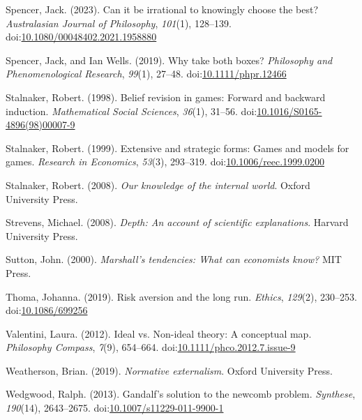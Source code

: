 \documentclass[
  12pt,
  letterpaper,
  DIV=11,
  numbers=noendperiod]{scrreprt}
\newlength{\cslhangindent}
\newenvironment{CSLReferences}[2] %
 {\begin{list}{}{%
  \setlength{\itemindent}{0pt}
  \setlength{\leftmargin}{0pt}
  \setlength{\parsep}{0pt}
  \ifodd #1
   \setlength{\leftmargin}{\cslhangindent}
   \setlength{\itemindent}{-1\cslhangindent}
  \fi
  \setlength{\itemsep}{#2\baselineskip}}}
 {\end{list}}
\begin{document}
\begin{CSLReferences}{1}{0}
Spencer, Jack. (2023). Can it be irrational to knowingly choose the
best? \emph{Australasian Journal of Philosophy}, \emph{101}(1),
128--139.
doi:\href{https://doi.org/10.1080/00048402.2021.1958880}{10.1080/00048402.2021.1958880}

Spencer, Jack, and Ian Wells. (2019). Why take both boxes?
\emph{{P}hilosophy and {P}henomenological {R}esearch}, \emph{99}(1),
27--48.
doi:\href{https://doi.org/10.1111/phpr.12466}{10.1111/phpr.12466}

Stalnaker, Robert. (1998). Belief revision in games: Forward and
backward induction. \emph{Mathematical Social Sciences}, \emph{36}(1),
31--56.
doi:\href{https://doi.org/10.1016/S0165-4896(98)00007-9}{10.1016/S0165-4896(98)00007-9}

Stalnaker, Robert. (1999). Extensive and strategic forms: Games and
models for games. \emph{Research in Economics}, \emph{53}(3), 293--319.
doi:\href{https://doi.org/10.1006/reec.1999.0200}{10.1006/reec.1999.0200}

Stalnaker, Robert. (2008). \emph{Our knowledge of the internal world}.
Oxford University Press.

Strevens, Michael. (2008). \emph{Depth: An account of scientific
explanations}. Harvard University Press.

Sutton, John. (2000). \emph{Marshall's tendencies: What can economists
know?} {MIT} Press.

Thoma, Johanna. (2019). Risk aversion and the long run. \emph{Ethics},
\emph{129}(2), 230--253.
doi:\href{https://doi.org/10.1086/699256}{10.1086/699256}

Valentini, Laura. (2012). Ideal vs. Non-ideal theory: A conceptual map.
\emph{Philosophy Compass}, \emph{7}(9), 654--664.
doi:\href{https://doi.org/10.1111/phco.2012.7.issue-9}{10.1111/phco.2012.7.issue-9}

Weatherson, Brian. (2019). \emph{Normative externalism}. Oxford
University Press.

Wedgwood, Ralph. (2013). Gandalf's solution to the newcomb problem.
\emph{Synthese}, \emph{190}(14), 2643--2675.
doi:\href{https://doi.org/10.1007/s11229-011-9900-1}{10.1007/s11229-011-9900-1}


\end{CSLReferences}
\end{document}
